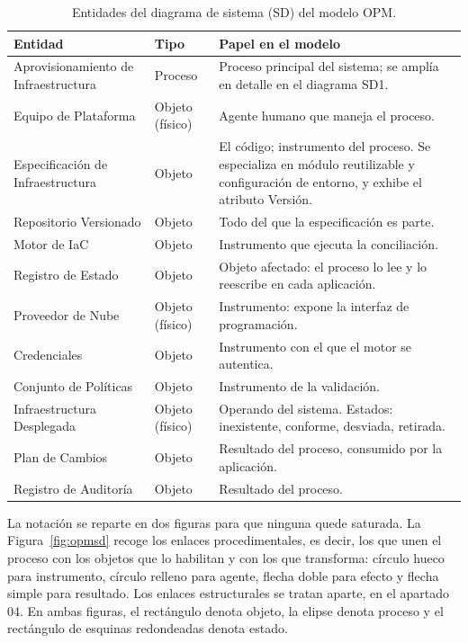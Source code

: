 \documentclass[11pt,letterpaper]{article}
\begin{document}
\begin{table}[ht]
  \centering
  \footnotesize
  \caption{Entidades del diagrama de sistema (SD) del modelo OPM.}
  \label{tab:entidades}
  \begin{tabularx}{\textwidth}{@{}>{\raggedright\arraybackslash}p{}
    >{\raggedright\arraybackslash}p{}
    >{\raggedright\arraybackslash}X@{}}
    \toprule
    \textbf{Entidad} & \textbf{Tipo} & \textbf{Papel en el modelo} \\
    \midrule
    Aprovisionamiento de Infraestructura & Proceso & Proceso principal del
      sistema; se amplía en detalle en el diagrama SD1. \\
    Equipo de Plataforma & Objeto (físico) & Agente humano que maneja el
      proceso. \\
    Especificación de Infraestructura & Objeto & El código; instrumento del
      proceso. Se especializa en módulo reutilizable y configuración de
      entorno, y exhibe el atributo Versión. \\
    Repositorio Versionado & Objeto & Todo del que la especificación es
      parte. \\
    Motor de IaC & Objeto & Instrumento que ejecuta la conciliación. \\
    Registro de Estado & Objeto & Objeto afectado: el proceso lo lee y lo
      reescribe en cada aplicación. \\
    Proveedor de Nube & Objeto (físico) & Instrumento: expone la interfaz de
      programación. \\
    Credenciales & Objeto & Instrumento con el que el motor se autentica. \\
    Conjunto de Políticas & Objeto & Instrumento de la validación. \\
    Infraestructura Desplegada & Objeto (físico) & Operando del sistema.
      Estados: inexistente, conforme, desviada, retirada. \\
    Plan de Cambios & Objeto & Resultado del proceso, consumido por la
      aplicación. \\
    Registro de Auditoría & Objeto & Resultado del proceso. \\
    \bottomrule
  \end{tabularx}
\end{table}

La notación se reparte en dos figuras para que ninguna quede saturada. La
Figura~\ref{fig:opmsd} recoge los enlaces procedimentales, es decir, los que
unen el proceso con los objetos que lo habilitan y con los que transforma:
círculo hueco para instrumento, círculo relleno para agente, flecha doble
para efecto y flecha simple para resultado. Los enlaces estructurales se
tratan aparte, en el apartado 04. En ambas figuras, el rectángulo denota
objeto, la elipse denota proceso y el rectángulo de esquinas redondeadas
denota estado.
\end{document}
